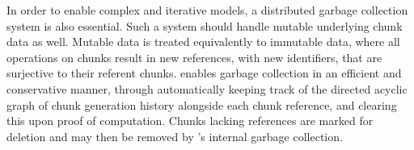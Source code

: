 In order to enable complex and iterative models, a distributed garbage collection system is also essential.
Such a system should handle mutable underlying chunk data as well.
Mutable data is treated equivalently to immutable data, where all operations on chunks result in new references, with new identifiers, that are surjective to their referent chunks.
\lsr enables garbage collection in an efficient and conservative manner, through automatically keeping track of the directed acyclic graph of chunk generation history alongside each chunk reference, and clearing this upon proof of computation.
Chunks lacking references are marked for deletion and may then be removed by \R's internal garbage collection.

